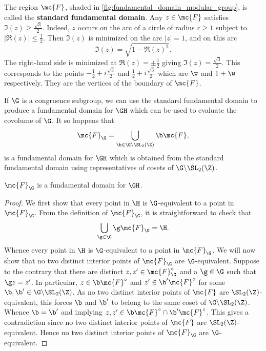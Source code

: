 \documentclass[12pt]{article}
\begin{document}
      The region \(\mc{F}\), shaded in \cref{fig:fundamental_domain_modular_group}, is called the \textbf{standard fundamental domain}. Any \(z \in \mc{F}\) satisfies \(\Im(z) \ge \frac{\sqrt{3}}{2}\). Indeed, \(z\) occurs on the arc of a circle of radius \(r \ge 1\) subject to \(|\Re(z)| \le \frac{1}{2}\). Then \(\Im(z)\) is minimized on the arc \(|z| = 1\), and on this arc
      \[
        \Im(z) = \sqrt{1-\Re(z)^{2}}.
      \]
      The right-hand side is minimized at \(\Re(z) = \pm\frac{1}{2}\) giving \(\Im(z) = \frac{\sqrt{3}}{2}\). This corresponds to the points \(-\frac{1}{2}+i\frac{\sqrt{3}}{2}\) and \(\frac{1}{2}+i\frac{\sqrt{3}}{2}\) which are \(\w\) and \(1+\w\) respectively. They are the vertices of the boundary of \(\mc{F}\).
  
      If \(\G\) is a congruence subgroup, we can use the standard fundamental domain to produce a fundamental domain for \(\GH\) which can be used to evaluate the covolume of \(\G\). It so happens that
      \[
        \mc{F}_{\G} = \bigcup_{\b \in \G\backslash\SL_{2}(\Z)}\b\mc{F},
      \] 
      is a fundamental domain for \(\GH\) which is obtained from the standard fundamental domain using representatives of cosets of \(\G\backslash\SL_{2}(\Z)\).

      \begin{proposition}\label{prop:fundamental_domain_congruence_subgroup}
        \(\mc{F}_{\G}\) is a fundamental domain for \(\GH\).
      \end{proposition}
      \begin{proof}
        We first show that every point in \(\H\) is \(\G\)-equivalent to a point in \(\mc{F}_{\G}\). From the definition of \(\mc{F}_{\G}\), it is straightforward to check that
        \[
          \bigcup_{\g \in \G}\g\mc{F}_{\G} = \H.
        \]
        Whence every point in \(\H\) is \(\G\)-equivalent to a point in \(\mc{F}_{\G}\). We will now show that no two distinct interior points of \(\mc{F}_{\G}\) are \(\G\)-equivalent. Suppose to the contrary that there are distinct \(z,z' \in \mc{F}_{\G}^{\circ}\) and a \(\g \in \G\) such that \(\g z = z'\). In particular, \(z \in \b\mc{F}^{\circ}\) and \(z' \in \b'\mc{F}^{\circ}\) for some \(\b,\b' \in \G\backslash\SL_{2}(\Z)\). As no two distinct interior points of \(\mc{F}\) are \(\SL_{2}(\Z)\)-equivalent, this forces \(\b\) and \(\b'\) to belong to the same coset of \(\G\backslash\SL_{2}(\Z)\). Whence \(\b = \b'\) and implying \(z,z' \in \b\mc{F}^{\circ} \cap \b'\mc{F}^{\circ}\). This gives a contradiction since no two distinct interior points of \(\mc{F}\) are \(\SL_{2}(\Z)\)-equivalent. Hence no two distinct interior points of \(\mc{F}_{\G}\) are \(\G\)-equivalent.
      \end{proof}
\end{document}
